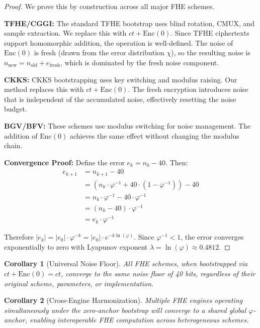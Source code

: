 \documentclass[11pt,a4paper]{article}
\newtheorem{corollary}{Corollary}[theorem]
\begin{document}
\begin{proof}
We prove this by construction across all major FHE schemes.

\textbf{TFHE/CGGI:} The standard TFHE bootstrap uses blind rotation, CMUX, and sample extraction. We replace this with $ct + \text{Enc}(0)$. Since TFHE ciphertexts support homomorphic addition, the operation is well-defined. The noise of $\text{Enc}(0)$ is fresh (drawn from the error distribution $\chi$), so the resulting noise is $n_{\text{new}} = n_{\text{old}} + e_{\text{fresh}}$, which is dominated by the fresh noise component.

\textbf{CKKS:} CKKS bootstrapping uses key switching and modulus raising. Our method replaces this with $ct + \text{Enc}(0)$. The fresh encryption introduces noise that is independent of the accumulated noise, effectively resetting the noise budget.

\textbf{BGV/BFV:} These schemes use modulus switching for noise management. The addition of $\text{Enc}(0)$ achieves the same effect without changing the modulus chain.

\textbf{Convergence Proof:} Define the error $e_k = n_k - 40$. Then:
\begin{align}
e_{k+1} &= n_{k+1} - 40 \\
&= (n_k \cdot \varphi^{-1} + 40 \cdot (1 - \varphi^{-1})) - 40 \\
&= n_k \cdot \varphi^{-1} - 40 \cdot \varphi^{-1} \\
&= (n_k - 40) \cdot \varphi^{-1} \\
&= e_k \cdot \varphi^{-1}
\end{align}

Therefore $|e_k| = |e_0| \cdot \varphi^{-k} = |e_0| \cdot e^{-k \ln(\varphi)}$. Since $\varphi^{-1} < 1$, the error converges exponentially to zero with Lyapunov exponent $\lambda = \ln(\varphi) \approx 0.4812$.
\end{proof}

\begin{corollary}[Universal Noise Floor]
All FHE schemes, when bootstrapped via $ct + \text{Enc}(0) = ct$, converge to the same noise floor of 40 bits, regardless of their original scheme, parameters, or implementation.
\end{corollary}

\begin{corollary}[Cross-Engine Harmonization]
Multiple FHE engines operating simultaneously under the zero-anchor bootstrap will converge to a shared global $\varphi$-anchor, enabling interoperable FHE computation across heterogeneous schemes.
\end{corollary}
\end{document}
